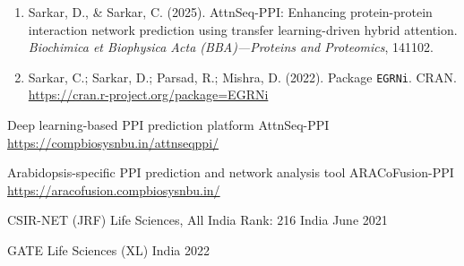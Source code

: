 \documentclass[11pt, a4paper]{awesome-cv}
\begin{document}
\begin{cvparagraph}
\begin{enumerate}
  \item Sarkar, D., \& Sarkar, C. (2025). AttnSeq-PPI: Enhancing protein-protein interaction network prediction using transfer learning-driven hybrid attention. \textit{Biochimica et Biophysica Acta (BBA)---Proteins and Proteomics}, 141102.
  \item Sarkar, C.; Sarkar, D.; Parsad, R.; Mishra, D. (2022). Package \texttt{EGRNi}. CRAN. \url{https://cran.r-project.org/package=EGRNi}
\end{enumerate}
\end{cvparagraph}

\begin{cvskills}
\end{cvskills}

\begin{cventries}
  \cventry
    {Deep learning-based PPI prediction platform}
    {AttnSeq-PPI}
    {}{}
    {\url{https://compbiosysnbu.in/attnseqppi/}}

  \cventry
    {Arabidopsis-specific PPI prediction and network analysis tool}
    {ARACoFusion-PPI}
    {}{}
    {\url{https://aracofusion.compbiosysnbu.in/}}
\end{cventries}

\begin{cvhonors}
  \cvhonor
    {CSIR-NET (JRF)}
    {Life Sciences, All India Rank: 216}
    {India}
    {June 2021}

  \cvhonor
    {GATE}
    {Life Sciences (XL)}
    {India}
    {2022}
\end{cvhonors}
\end{document}
